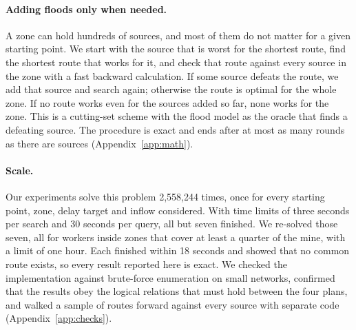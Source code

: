 \paragraph{Adding floods only when needed.}
A zone can hold hundreds of sources, and most of them do not matter for a given starting point. We start with the source that is worst for the shortest route, find the shortest route that works for it, and check that route against every source in the zone with a fast backward calculation. If some source defeats the route, we add that source and search again; otherwise the route is optimal for the whole zone. If no route works even for the sources added so far, none works for the zone. This is a cutting-set scheme \cite{mutapcic2009} with the flood model as the oracle that finds a defeating source. The procedure is exact and ends after at most as many rounds as there are sources (Appendix~\ref{app:math}).

\paragraph{Scale.}
Our experiments solve this problem 2,558,244 times, once for every starting point, zone, delay target and inflow considered. With time limits of three seconds per search and 30 seconds per query, all but seven finished. We re-solved those seven, all for workers inside zones that cover at least a quarter of the mine, with a limit of one hour. Each finished within 18 seconds and showed that no common route exists, so every result reported here is exact. We checked the implementation against brute-force enumeration on small networks, confirmed that the results obey the logical relations that must hold between the four plans, and walked a sample of routes forward against every source with separate code (Appendix~\ref{app:checks}).
